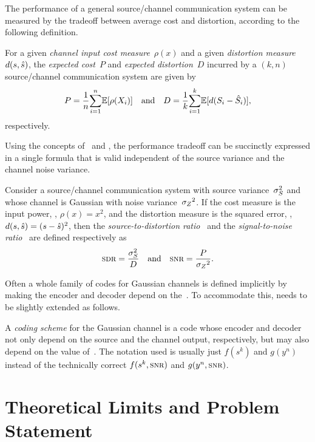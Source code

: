 The performance of a general source/channel communication system can be measured
by the tradeoff between average cost and distortion, according to the following
definition.
\begin{definition}
  \label{def:PDgen}
  For a given \emph{channel input cost measure}~$\rho(x)$ and a given
  \emph{distortion measure}~$d(s,{\hat{s}})$, the \emph{expected cost}~$P$ and
  \emph{expected distortion}~$D$ incurred by a $(k,n)$ source/channel
  communication system are given by
  \begin{equation*}
    P = \frac1n {\sum_{i=1}^n} \mathbb{E}[\rho(X_i)] \quad \text{and} \quad
    D = \frac1k {\sum_{i=1}^k} \mathbb{E}[d(S_i - {\hat{S}}_i)],
  \end{equation*}
  respectively.
\end{definition}

Using the concepts of \sdr\ and \snr, the performance tradeoff can be succinctly
expressed in a single formula that is valid independent of the source variance
and the channel noise variance. 
\begin{definition}
  \label{def:sdrsnr}
  Consider a source/channel communication system with source
  variance~${\sigma_S^2}$ and whose channel is Gaussian with noise variance~${{\sigma_Z}^2}$. If
  the cost measure is the input power, \ie, $\rho(x) = x^2$, and the distortion
  measure is the squared error, \ie, $d(s,{\hat{s}}) = (s - {\hat{s}})^2$, then the
  \emph{source-to-distortion ratio} \sdr\ and the \emph{signal-to-noise ratio}
  \snr\ are defined respectively as
  \begin{equation*}
    \sdr = \frac{\ssq}{D} \quad \text{and} \quad
    \snr = \frac{P}{\szq}.
  \end{equation*}
\end{definition}

Often a whole family of codes for Gaussian channels is defined implicitly by
making the encoder and decoder depend on the~\snr. To accommodate this,
 needs to be slightly extended as follows.
\begin{definition}
  \label{def:codingscheme}
  A \emph{coding scheme} for the Gaussian channel is a code whose encoder and
  decoder not only depend on the source and the channel output, respectively,
  but may also depend on the value of~\snr. The notation used is usually just
  $f(s^k)$ and $g(y^n)$ instead of the technically correct $f(s^k,\snr)$ and
  $g(y^n,\snr)$.
\end{definition}


\section{Theoretical Limits and Problem Statement}\label{sec:limits}

